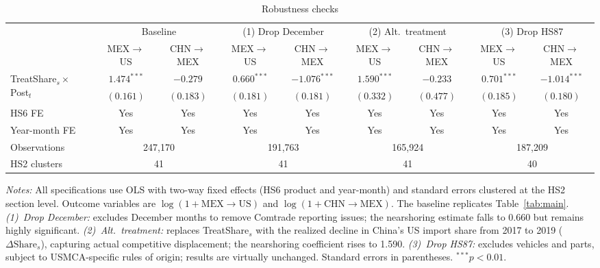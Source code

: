 \documentclass[11pt]{article}
\begin{document}
\begin{table}
\centering
\caption{Robustness checks}
\label{tab:robustness}
\begin{threeparttable}
\small
\begin{tabular}{lcccccccc}
\toprule
 & \multicolumn{2}{c}{Baseline}
 & \multicolumn{2}{c}{(1) Drop December}
 & \multicolumn{2}{c}{(2) Alt.\ treatment}
 & \multicolumn{2}{c}{(3) Drop HS87} \\
\cmidrule(lr){2-3}\cmidrule(lr){4-5}\cmidrule(lr){6-7}\cmidrule(lr){8-9}
 & MEX$\to$US & CHN$\to$MEX
 & MEX$\to$US & CHN$\to$MEX
 & MEX$\to$US & CHN$\to$MEX
 & MEX$\to$US & CHN$\to$MEX \\
\midrule
\multirow{2}{*}{TreatShare$_s \times$ Post$_t$}
 & $1.474^{***}$ & $-0.279$
 & $0.660^{***}$ & $-1.076^{***}$
 & $1.590^{***}$ & $-0.233$
 & $0.701^{***}$ & $-1.014^{***}$ \\[2pt]
 & $(0.161)$ & $(0.183)$
 & $(0.181)$ & $(0.181)$
 & $(0.332)$ & $(0.477)$
 & $(0.185)$ & $(0.180)$ \\[6pt]
\midrule
HS6 FE
 & Yes & Yes & Yes & Yes & Yes & Yes & Yes & Yes \\
Year-month FE
 & Yes & Yes & Yes & Yes & Yes & Yes & Yes & Yes \\
Observations
 & \multicolumn{2}{c}{247,170}
 & \multicolumn{2}{c}{191,763}
 & \multicolumn{2}{c}{165,924}
 & \multicolumn{2}{c}{187,209} \\
HS2 clusters
 & \multicolumn{2}{c}{41}
 & \multicolumn{2}{c}{41}
 & \multicolumn{2}{c}{41}
 & \multicolumn{2}{c}{40} \\
\bottomrule
\end{tabular}

\begin{tablenotes}[flushleft]
\footnotesize
\item \textit{Notes:}
All specifications use OLS with two-way fixed effects (HS6 product and
year-month) and standard errors clustered at the HS2 section level.
Outcome variables are $\log(1 + \mathrm{MEX}\to\mathrm{US})$ and
$\log(1 + \mathrm{CHN}\to\mathrm{MEX})$.
The baseline replicates Table~\ref{tab:main}.
\textit{(1)~Drop December:} excludes December months to remove Comtrade
reporting issues; the nearshoring estimate falls to 0.660 but remains
highly significant.
\textit{(2)~Alt.\ treatment:} replaces TreatShare$_s$ with the realized
decline in China's US import share from 2017 to 2019
($\Delta\mathrm{Share}_s$), capturing actual competitive displacement;
the nearshoring coefficient rises to 1.590.
\textit{(3)~Drop HS87:} excludes vehicles and parts, subject to
USMCA-specific rules of origin; results are virtually unchanged.
Standard errors in parentheses.
$^{***}p < 0.01$.
\end{tablenotes}

\end{threeparttable}
\end{table}
\end{document}
